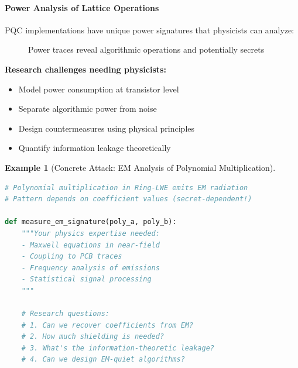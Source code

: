 \documentclass[11pt,a4paper]{article}
\newtheorem{example}{Example}
\begin{document}
\paragraph{Power Analysis of Lattice Operations}

PQC implementations have unique power signatures that physicists can analyze:

\begin{figure}[h]
\centering
{}
\caption{Power traces reveal algorithmic operations and potentially secrets}
\end{figure}

\textbf{Research challenges needing physicists:}
\begin{itemize}
    \item Model power consumption at transistor level
    \item Separate algorithmic power from noise
    \item Design countermeasures using physical principles
    \item Quantify information leakage theoretically
\end{itemize}

\begin{example}[Concrete Attack: EM Analysis of Polynomial Multiplication]
\begin{lstlisting}[language=Python, caption=Research Direction: EM Side Channels]
# Polynomial multiplication in Ring-LWE emits EM radiation
# Pattern depends on coefficient values (secret-dependent!)

def measure_em_signature(poly_a, poly_b):
    """Your physics expertise needed:
    - Maxwell equations in near-field
    - Coupling to PCB traces
    - Frequency analysis of emissions
    - Statistical signal processing
    """
    
    # Research questions:
    # 1. Can we recover coefficients from EM?
    # 2. How much shielding is needed?
    # 3. What's the information-theoretic leakage?
    # 4. Can we design EM-quiet algorithms?
\end{lstlisting}
\end{example}
\end{document}
